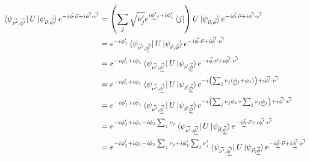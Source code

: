 \begin{align*}
  \braKet{\psiVec{\nu'}{\phi'}}{U}{\psiVec{\nu}{\phi}} e^{-i \vec{\phi} \cdot \vec{\nu} + i \vec{\phi'} \cdot \vec{\nu'}} &= \left(\sum_{j} \sqrt{\nu'_{j}} e^{i \undertilde{\phi'}_{j} + i\phi'_{1}} \bra{j}  \right) U \ket{\psiVec{\nu}{\phi}} e^{-i \vec{\phi} \cdot \vec{\nu} + i \vec{\phi'} \cdot \vec{\nu'}} \\
                                                                                                                             &= e^{-i\phi'_{1}} \braKet{\psiVec{\nu'} {\undertilde{\phi'}}}{U}{\psiVec{\nu}{\phi}} e^{-i \vec{\phi} \cdot \vec{\nu} + i \vec{\phi'} \cdot \vec{\nu'}} \\
                                                                                                                             &= e^{-i\phi'_{1} + i \phi_{1}} \braKet{\psiVec{\nu'}{\undertilde{\phi'}}}{U}{\psiVec{\nu}{\undertilde{\phi}}} e^{-i \vec{\phi} \cdot \vec{\nu} + i \vec{\phi'} \cdot \vec{\nu'}} \\
                                                                                                                             &= e^{-i\phi'_{1} + i \phi_{1}} \braKet{\psiVec{\nu'} {\undertilde{\phi'}}}{U}{\psiVec{\nu}{\undertilde{\phi}}} e^{-i \left(\sum_{j} \nu_{j}(\undertilde{\phi}_{j} + \phi_{1}) \right) + i \vec{\phi'} \cdot \vec{\nu'}} \\
                                                                                                                             &= e^{-i\phi'_{1} + i \phi_{1}} \braKet{\psiVec{\nu'} {\undertilde{\phi'}}}{U}{\psiVec{\nu}{\undertilde{\phi}}} e^{-i \left( \sum_{j} \nu_{j} \phi_{1} + \sum_{j} \nu_{j}\undertilde{\phi}_{j} \right) + i \vec{\phi'} \cdot \vec{\nu'}} \\
                                                                                                                             &= e^{-i\phi'_{1} + i \phi_{1} -i \phi_{1} \sum_{j} \nu_{j}} \braKet{\psiVec{\nu'} {\undertilde{\phi'}}}{U}{\psiVec{\nu}{\undertilde{\phi}}} e^{-i \vec{\undertilde{\phi}} \cdot \vec{\nu} + i \vec{\phi'} \cdot \vec{\nu'}} \\
                                                                                                                             &= e^{-i\phi'_{1} + i \phi_{1} -i \phi_{1} \sum_{j} \nu_{j} +i \phi'_{1} \sum_{j} \nu'_{j}} \braKet{\psiVec{\nu'} {\undertilde{\phi'}}}{U}{\psiVec{\nu}{\undertilde{\phi}}} e^{-i \vec{\undertilde{\phi}} \cdot \vec{\nu} + i \vec{\undertilde{\phi'}} \cdot \vec{\nu'}} \\
\end{align*}
